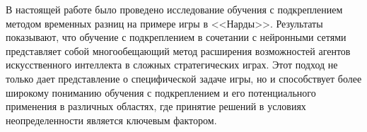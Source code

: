 В настоящей работе было проведено исследование обучения с подкреплением методом временных разниц на примере игры в <<Нарды>>. Результаты показывают, что обучение с подкреплением в сочетании с нейронными сетями представляет собой многообещающий метод расширения возможностей агентов искусственного интеллекта в сложных стратегических играх. Этот подход не только дает представление о специфической задаче игры, но и способствует более широкому пониманию обучения с подкреплением и его потенциального применения в различных областях, где принятие решений в условиях неопределенности является ключевым фактором.
